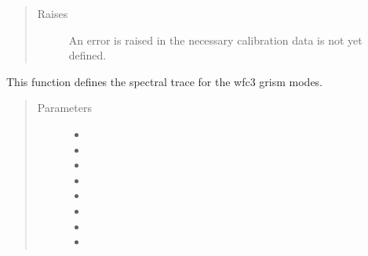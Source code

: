 \documentclass[a4paper,10pt,english]{sphinxmanual}
\begin{document}
\begin{fulllineitems}
\begin{fulllineitems}
\begin{quote}
\begin{description}
\item[{Raises}] \leavevmode
{} \textendash{} An error is raised in the necessary calibration data is
not yet defined.

\end{description}\end{quote}

\end{fulllineitems}


\begin{fulllineitems}
\label{\detokenize{cascade.instruments:cascade.instruments.instruments.HSTWFC3._WFC3Trace}}
This function defines the spectral trace for the wfc3 grism modes.
\begin{quote}\begin{description}
\item[{Parameters}] \leavevmode\begin{itemize}
\item {} 
 \textendash{} 

\item {} 
 \textendash{} 

\item {} 
 \textendash{} 

\item {} 
 \textendash{} 

\item {} 
 \textendash{} 

\item {} 
 \textendash{} 

\item {} 
 \textendash{} 

\item {} 
 \textendash{} 


\end{itemize}
\end{description}
\end{quote}
\end{fulllineitems}
\end{fulllineitems}
\end{document}
